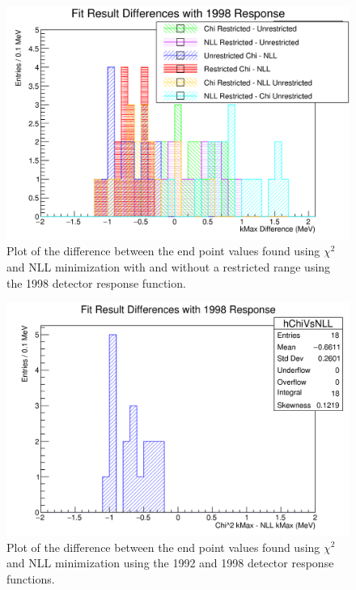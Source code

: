 \begin{figure}[h]
  \centering
  \includegraphics[width=\linewidth]{figures/png/compare_fit_results.png}
  \caption{Plot of the difference between the end point values found using $\chi^2$ and
    NLL minimization with and without a restricted range using the 1998 detector response function.}
  \label{fig:compareFits}
\end{figure}

\begin{figure}[h]
  \centering
  \includegraphics[width=\linewidth]{figures/png/compare_fit_results_unrestrictedOnly.png}
  \caption{Plot of the difference between the end point values found using $\chi^2$ and
    NLL minimization using the 1992 and 1998 detector response functions.}
  \label{fig:compareFits}
\end{figure}


